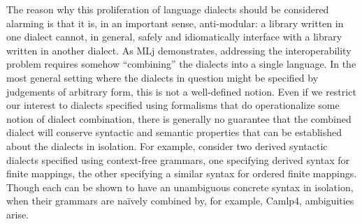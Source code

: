 The reason why this proliferation of language dialects should be considered alarming is that it is, in an important sense, anti-modular: a library written in one dialect cannot, in general, safely and idiomatically interface with a library written in another dialect. %
As MLj demonstrates, addressing the interoperability problem requires somehow ``combining'' the  dialects into a single language. In the most general setting where the dialects in question might be specified by judgements of arbitrary form, this is not a well-defined notion. Even if we restrict our interest to dialects specified using formalisms that do operationalize some notion of dialect combination, there is generally no guarantee that the combined dialect will conserve syntactic and semantic properties that can be established about the dialects in isolation. %
For example, consider two derived syntactic dialects specified using context-free grammars, one specifying derived syntax for finite mappings, the other specifying a similar syntax for ordered finite mappings. Though each can be shown to have an unambiguous concrete syntax in isolation, when their grammars are na\"ively  combined by, for example, Camlp4,  ambiguities  arise.  %
